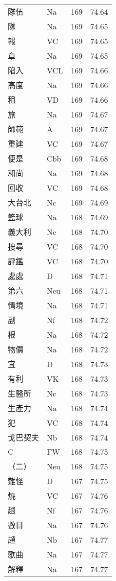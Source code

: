 \documentclass[twocolumn]{book}
\begin{document}
\begin{supertabular}{llrr}
隊伍 & Na & 169 &  74.64\\
隊 & Na & 169 &  74.65\\
報 & VC & 169 &  74.65\\
章 & Na & 169 &  74.65\\
陷入 & VCL & 169 &  74.66\\
高度 & Na & 169 &  74.66\\
租 & VD & 169 &  74.66\\
旅 & Na & 169 &  74.67\\
師範 & A & 169 &  74.67\\
重建 & VC & 169 &  74.67\\
便是 & Cbb & 169 &  74.68\\
和尚 & Na & 169 &  74.68\\
回收 & VC & 169 &  74.68\\
大台北 & Nc & 169 &  74.69\\
籃球 & Na & 168 &  74.69\\
義大利 & Nc & 168 &  74.70\\
搜尋 & VC & 168 &  74.70\\
評鑑 & VC & 168 &  74.70\\
處處 & D & 168 &  74.71\\
第六 & Neu & 168 &  74.71\\
情境 & Na & 168 &  74.71\\
副 & Nf & 168 &  74.72\\
根 & Na & 168 &  74.72\\
物價 & Na & 168 &  74.72\\
宜 & D & 168 &  74.73\\
有利 & VK & 168 &  74.73\\
生醫所 & Nc & 168 &  74.73\\
生產力 & Na & 168 &  74.74\\
犯 & VC & 168 &  74.74\\
戈巴契夫 & Nb & 168 &  74.74\\
C & FW & 168 &  74.75\\
（二） & Neu & 168 &  74.75\\
難怪 & D & 167 &  74.75\\
燒 & VC & 167 &  74.76\\
趟 & Nf & 167 &  74.76\\
數目 & Na & 167 &  74.76\\
趙 & Nb & 167 &  74.77\\
歌曲 & Na & 167 &  74.77\\
解釋 & Na & 167 &  74.77\\

\end{supertabular}
\end{document}
